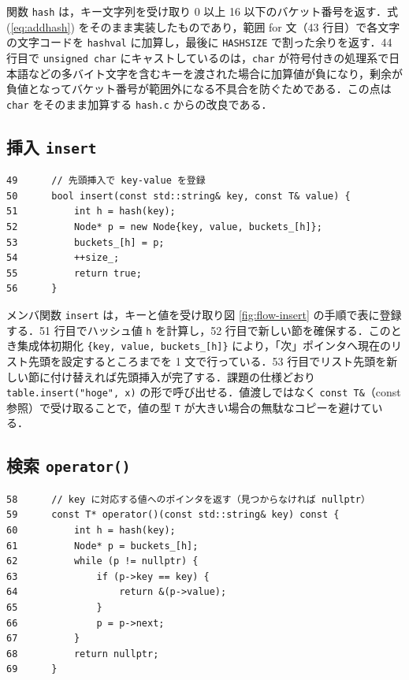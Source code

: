 関数 {\tt hash} は，キー文字列を受け取り 0 以上 16 以下のバケット番号を返す．式 (\ref{eq:addhash}) をそのまま実装したものであり，範囲 for 文（43 行目）で各文字の文字コードを {\tt hashval} に加算し，最後に {\tt HASHSIZE} で割った余りを返す．44 行目で {\tt unsigned char} にキャストしているのは，{\tt char} が符号付きの処理系で日本語などの多バイト文字を含むキーを渡された場合に加算値が負になり，剰余が負値となってバケット番号が範囲外になる不具合を防ぐためである．この点は {\tt char} をそのまま加算する {\tt hash.c} からの改良である．

\subsection{挿入 {\tt insert}}

\begin{verbatim}
49      // 先頭挿入で key-value を登録
50      bool insert(const std::string& key, const T& value) {
51          int h = hash(key);
52          Node* p = new Node{key, value, buckets_[h]};
53          buckets_[h] = p;
54          ++size_;
55          return true;
56      }
\end{verbatim}

メンバ関数 {\tt insert} は，キーと値を受け取り図 \ref{fig:flow-insert} の手順で表に登録する．51 行目でハッシュ値 {\tt h} を計算し，52 行目で新しい節を確保する．このとき集成体初期化 {\tt \{key, value, buckets\_[h]\}} により，「次」ポインタへ現在のリスト先頭を設定するところまでを 1 文で行っている．53 行目でリスト先頭を新しい節に付け替えれば先頭挿入が完了する．課題の仕様どおり {\tt table.insert("hoge", x)} の形で呼び出せる．値渡しではなく {\tt const T\&}（const 参照）で受け取ることで，値の型 {\tt T} が大きい場合の無駄なコピーを避けている．

\subsection{検索 {\tt operator()}}

\begin{verbatim}
58      // key に対応する値へのポインタを返す（見つからなければ nullptr）
59      const T* operator()(const std::string& key) const {
60          int h = hash(key);
61          Node* p = buckets_[h];
62          while (p != nullptr) {
63              if (p->key == key) {
64                  return &(p->value);
65              }
66              p = p->next;
67          }
68          return nullptr;
69      }
\end{verbatim}

